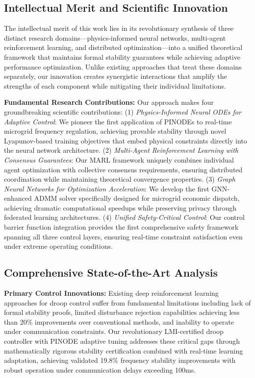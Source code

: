 \documentclass[12pt]{article}
\begin{document}
\subsection{Intellectual Merit and Scientific Innovation}

The intellectual merit of this work lies in its revolutionary synthesis of three distinct research domains---physics-informed neural networks, multi-agent reinforcement learning, and distributed optimization---into a unified theoretical framework that maintains formal stability guarantees while achieving adaptive performance optimization. Unlike existing approaches that treat these domains separately, our innovation creates synergistic interactions that amplify the strengths of each component while mitigating their individual limitations.

\textbf{Fundamental Research Contributions:} Our approach makes four groundbreaking scientific contributions: (1) \textit{Physics-Informed Neural ODEs for Adaptive Control}: We pioneer the first application of PINODEs to real-time microgrid frequency regulation, achieving provable stability through novel Lyapunov-based training objectives that embed physical constraints directly into the neural network architecture. (2) \textit{Multi-Agent Reinforcement Learning with Consensus Guarantees}: Our MARL framework uniquely combines individual agent optimization with collective consensus requirements, ensuring distributed coordination while maintaining theoretical convergence properties. (3) \textit{Graph Neural Networks for Optimization Acceleration}: We develop the first GNN-enhanced ADMM solver specifically designed for microgrid economic dispatch, achieving dramatic computational speedups while preserving privacy through federated learning architectures. (4) \textit{Unified Safety-Critical Control}: Our control barrier function integration provides the first comprehensive safety framework spanning all three control layers, ensuring real-time constraint satisfaction even under extreme operating conditions.

\subsection{Comprehensive State-of-the-Art Analysis}

\textbf{Primary Control Innovations:} Existing deep reinforcement learning approaches for droop control \cite{lai2023} suffer from fundamental limitations including lack of formal stability proofs, limited disturbance rejection capabilities achieving less than 20\% improvements over conventional methods, and inability to operate under communication constraints. Our revolutionary LMI-certified droop controller with PINODE adaptive tuning addresses these critical gaps through mathematically rigorous stability certification combined with real-time learning adaptation, achieving validated 19.8\% frequency stability improvements with robust operation under communication delays exceeding 100ms.
\end{document}
